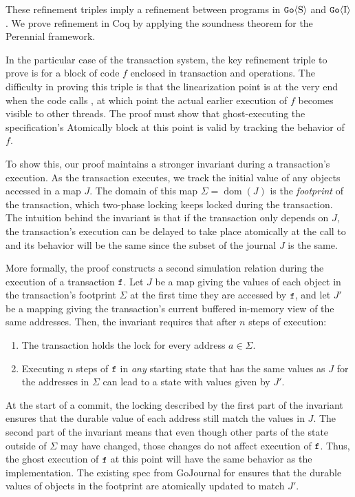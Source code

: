 These refinement triples imply a refinement between programs in $\mathtt{Go}\langle \mathrm{S} \rangle$
and $\mathtt{Go}\langle \mathrm{I} \rangle$. We prove refinement in Coq by applying the soundness
theorem for the Perennial framework.

In the particular case of the transaction system, the key refinement triple to
prove is for a block of code $f$ enclosed in transaction  and
 operations.
%
%
The difficulty in proving this triple is that the linearization point is at the
very end when the code calls , at which point the actual earlier
execution of $f$ becomes visible to other threads. The proof must show that
ghost-executing the specification's Atomically block at this point is valid by
tracking the behavior of $f$.

To show this, our proof maintains a stronger invariant during a transaction's execution. As the transaction executes, we track the
initial value of any objects accessed in a map $J$. The domain of this map
$\Sigma = \operatorname{dom}(J)$ is the \emph{footprint} of the transaction,
which two-phase locking keeps locked during the transaction. The intuition
behind the invariant is that if the transaction only depends on $J$, the
transaction's execution can be delayed to take place atomically at the call to
 and its behavior will be the same since the subset of the journal
$J$ is the same.

More formally, the proof constructs a second simulation relation during the
execution of a transaction $\cc{f}$.  Let $J$ be a map giving the values of each
object in the transaction's footprint $\Sigma$ at the first time they are
accessed by $\cc{f}$, and let $J'$ be a mapping giving the transaction's current
buffered in-memory view of the same addresses.  Then, the invariant requires
that after $n$ steps of execution:
%
\begin{enumerate}

\item The transaction holds the lock for every address $a \in \Sigma$.

\item Executing $n$ steps of $\cc{f}$ in \emph{any} starting state that has the same
  values as $J$ for the addresses in $\Sigma$ can lead to a state with values given
  by $J'$.

\end{enumerate}
%
At the start of a commit, the locking described by the first part of the
invariant ensures that the durable value of each address still match the values
in $J$. The second part of the invariant means that even though other
parts of the state outside of $\Sigma$ may have changed, those changes do not
affect execution of $\cc{f}$. Thus, the ghost execution of $\cc{f}$ at this point will
have the same behavior as the implementation. The existing spec from GoJournal
for  ensures that the durable values of objects in the footprint are
atomically updated to match $J'$.

